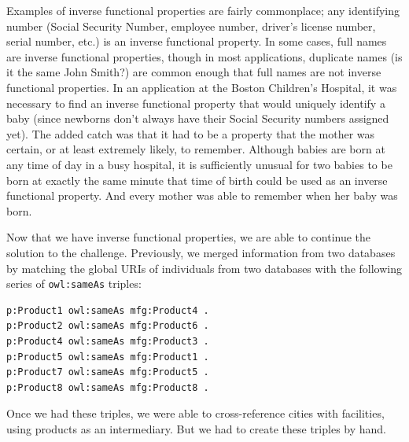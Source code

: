 Examples of inverse functional properties are fairly commonplace; any
identifying number (Social Security Number, employee number, driver's
license number, serial number, etc.) is an inverse functional property.
In some cases, full names are inverse functional properties, though in
most applications, duplicate names (is it the same John Smith?) are
common enough that full names are not inverse functional properties. In
an application at the Boston Children's Hospital, it was necessary to
find an inverse functional property that would uniquely identify a baby
(since newborns don't always have their Social Security numbers assigned
yet). The added catch was that it had to be a property that the mother
was certain, or at least extremely likely, to remember. Although babies
are born at any time of day in a busy hospital, it is sufficiently
unusual for two babies to be born at exactly the same minute that time
of birth could be used as an inverse functional property. And every
mother was able to remember when her baby was born.

Now that we have inverse functional properties, we are able to continue
the solution to the challenge. Previously, we merged information from
two databases by matching the global URIs of individuals from two
databases with the following series of \texttt{owl:sameAs} triples:

\begin{lstlisting}
p:Product1 owl:sameAs mfg:Product4 .
p:Product2 owl:sameAs mfg:Product6 .
p:Product4 owl:sameAs mfg:Product3 .
p:Product5 owl:sameAs mfg:Product1 .
p:Product7 owl:sameAs mfg:Product5 .
p:Product8 owl:sameAs mfg:Product8 .
\end{lstlisting}

Once we had these triples, we were able to cross-reference cities with
facilities, using products as an intermediary. But we had to create
these triples by hand.

